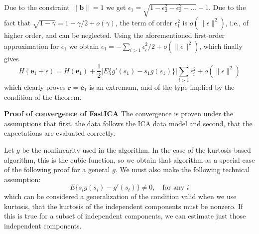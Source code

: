 \documentclass[12pt,a4paper,twoside,openany]{book}
\begin{document}
Due to the constraint $\|\mathbf{b}\| = 1$ we get $\epsilon_1 = \sqrt{1 - \epsilon_2^2 - \epsilon_3^2 - \dots} - 1$. 
Due to the fact that $\sqrt{1 - \gamma} = 1 - \gamma/2 + o(\gamma)$, the term of order $\epsilon_1^2$ is $o(\|\epsilon\|^2)$, i.e., of higher order, 
and can be neglected. Using the aforementioned first-order approximation for $\epsilon_1$ we obtain $\epsilon_1 = - \sum_{i>1} \epsilon_i^2 / 2 + o(\|\epsilon\|^2)$, which finally gives
\begin{equation}
    H(\mathbf{e}_1 + \epsilon) = H(\mathbf{e}_1) + \frac{1}{2} \Big[ E\{g'(s_1) - s_1 g(s_1)\} \Big] \sum_{i>1} \epsilon_i^2 + o(\|\epsilon\|^2)
\end{equation}
which clearly proves $\mathbf{r} = \mathbf{e}_1$ is an extremum, and of the type implied by the condition of the theorem.

\vspace{1em}
\noindent\textbf{Proof of convergence of FastICA} \cite[Chapter 8]{hyvarinen2001} The convergence is proven under the assumptions that first, 
the data follows the ICA data model and second, that the expectations are evaluated correctly.

Let $g$ be the nonlinearity used in the algorithm. In the case of the kurtosis-based algorithm, this is the cubic function, 
so we obtain that algorithm as a special case of the following proof for a general $g$. We must also make the following technical assumption:
\begin{equation}
    E\{s_i g(s_i) - g'(s_i)\} \neq 0, \quad \text{for any } i
\end{equation}
which can be considered a generalization of the condition valid when we use kurtosis, that the kurtosis of the independent components must be nonzero. 
If this is true for a subset of independent components, we can estimate just those independent components.
\end{document}
